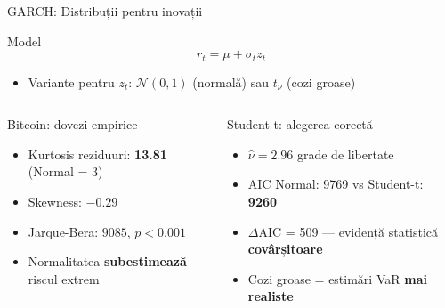 \documentclass[9pt, aspectratio=169, t]{beamer}
\begin{document}
\begin{frame}{GARCH: Distribuții pentru inovații}
    \vspace{-0.2cm}
    \begin{block}{Model}
        \vspace{-0.2cm}
        \[
        r_t = \mu + \sigma_t z_t
        \]
        \begin{itemize}\setlength{\itemsep}{0pt}
            \item Variante pentru $z_t$: $\mathcal{N}(0,1)$ (normală) sau $t_{\nu}$ (cozi groase)
        \end{itemize}
    \end{block}

    \vspace{-0.1cm}

    \begin{columns}[T]
        \begin{alertblock}{Bitcoin: dovezi empirice}
            \begin{itemize}\setlength{\itemsep}{0pt}
                \item Kurtosis reziduuri: \textbf{13.81} (Normal = 3)
                \item Skewness: $-0.29$
                \item Jarque-Bera: $9085$, $p < 0.001$
                \item Normalitatea \textbf{subestimează} riscul extrem
            \end{itemize}
        \end{alertblock}

        \begin{exampleblock}{Student-t: alegerea corectă}
            \begin{itemize}\setlength{\itemsep}{0pt}
                \item $\hat{\nu} = 2.96$ grade de libertate
                \item AIC Normal: 9769 vs Student-t: \textbf{9260}
                \item $\Delta$AIC = 509 --- evidență statistică \textbf{covârșitoare}
                \item Cozi groase = estimări VaR \textbf{mai realiste}
            \end{itemize}
        \end{exampleblock}
    \end{columns}
\end{frame}
\end{document}
